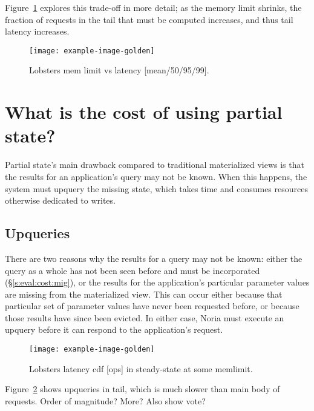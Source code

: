 Figure~\ref{f:lobsters-mem-latency} explores this trade-off in more detail; as
the memory limit shrinks, the fraction of requests in the tail that must be
computed increases, and thus tail latency increases.

\begin{figure}[h]
  \centering
  \texttt{[image: example-image-golden]}
  \caption{Lobsters mem limit vs latency [mean/50/95/99].}
  \label{f:lobsters-mem-latency}
\end{figure}

\section{What is the cost of using partial state?}
\label{s:eval:cost}


Partial state's main drawback compared to traditional materialized views is
that the results for an application's query may not be known. When this happens,
the system must upquery the missing state, which takes time and consumes
resources otherwise dedicated to writes.

\subsection{Upqueries}

There are two reasons why the results for a query may not be known: either the
query as a whole has not been seen before and must be incorporated
(\S\ref{s:eval:cost:mig}), or the results for the application's particular
parameter values are missing from the materialized view. This can occur either
because that particular set of parameter values have never been requested
before, or because those results have since been evicted. In either case, Noria
must execute an upquery before it can respond to the application's request.

\begin{figure}[h]
  \centering
  \texttt{[image: example-image-golden]}
  \caption{Lobsters latency cdf [ops] in steady-state at some memlimit.}
  \label{f:lobsters-latency-steady}
\end{figure}

\begin{inprogress}
Figure~\ref{f:lobsters-latency-steady} shows upqueries in tail, which is much
slower than main body of requests. Order of magnitude? More? Also show vote?
\end{inprogress}

